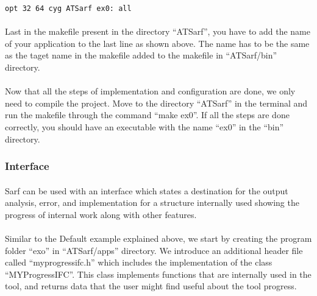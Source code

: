 \documentclass{article}
\begin{document}
\begin{verbatim}
opt 32 64 cyg ATSarf ex0: all
\end{verbatim}

\paragraph{}
Last in the makefile present in the directory ``ATSarf'', you have to add the name of your application to the last line as shown above. The name has to be the same as the taget name in the makefile added to the makefile in ``ATSarf/bin'' directory.

\paragraph{}
Now that all the steps of implementation and configuration are done, we only need to compile the project. Move to the directory ``ATSarf'' in the terminal and run the makefile through the command ``make ex0''. If all the steps are done correctly, you should have an executable with the name ``ex0'' in the ``bin'' directory.

\subsubsection{Interface}
\label{subsubsec:interface}

\paragraph{}
Sarf can be used with an interface which states a destination for the output analysis, error, and implementation for a structure internally used showing the progress of internal work along with other features.

\paragraph{}
Similar to the Default example explained above, we start by creating the program folder ``exo'' in ``ATSarf/apps'' directory. We introduce an additional header file called ``myprogressifc.h'' which includes the implementation of the class ``MYProgressIFC''. This class implements functions that are internally used in the tool, and returns data that the user might find useful about the tool progress.
\end{document}
